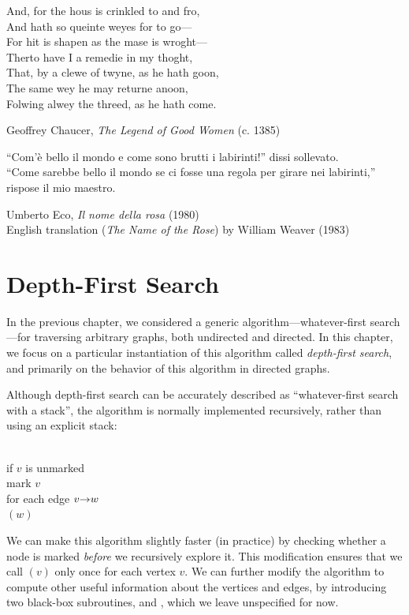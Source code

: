 \epigraph{And, for the hous is crinkled to and fro,\\And hath so queinte weyes for to go---\\For hit is shapen as the mase is wroght---\\Therto have I a remedie in my thoght,\\That, by a clewe of twyne, as he hath goon,\\The same wey he may returne anoon,\\Folwing alwey the threed, as he hath come.}{Geoffrey Chaucer, \textit{The Legend of Good Women} (c. 1385)}

\epigraph{“Com’è bello il mondo e come sono brutti i labirinti!” dissi sollevato.\\“Come sarebbe bello il mondo se ci fosse una regola per girare nei labirinti,” rispose il mio maestro.\par[“How beautiful the world is, and how ugly labyrinths are,” I said, relieved.\\“How beautiful the world would be if there were a procedure for moving through labyrinths,” my master replied.]}{Umberto Eco, \textit{Il nome della rosa} (1980)\\English translation (\textit{The Name of the Rose}) by William Weaver (1983)}

\chapter{Depth-First Search}
\label{ch:6}

In the previous chapter, we considered a generic algorithm---whatever-first search---for traversing arbitrary graphs, both undirected and directed.
In this chapter, we focus on a particular instantiation of this algorithm called \textit{depth-first search}, and primarily on the behavior of this algorithm in directed graphs.

Although depth-first search can be accurately described as “whatever-first search with a stack”, the algorithm is normally implemented recursively, rather than using an explicit stack:

\begin{pseudocode}
\\
if $v$ is unmarked\\
\Indent mark $v$\\
\Indent for each edge $v\mathord{\rightarrow}w$\\
\Indent\Indent {}$(w)$
\end{pseudocode}
We can make this algorithm slightly faster (in practice) by checking whether a node is marked \textit{before} we recursively explore it.
This modification ensures that we call $(v)$ only once for each vertex $v$.
We can further modify the algorithm to compute other useful information about the vertices and edges, by introducing two black-box subroutines,  and , which we leave unspecified for now.

